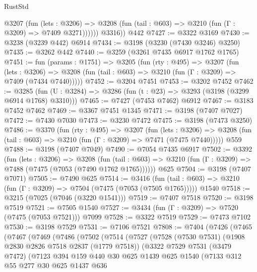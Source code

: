 \begin{lexlean}{RustStd}
\begin{coremodule}
            @3207
              (fun (lets : @3206) =>
              @3208 (fun (tail : @603) => @3210 (fun (Γ : @3209) => @7409 @3271))))))
        @3316))
    @442
@7427 := @3322 @3169
@7430 := @3238 (@3239 @442) @6914
@7434 := @3198 (@3230 (@7430 @3246) @3250)
@7435 := @3262 @442
@7440 := @3259 (@3261 @7435 @6917 @1762 @1765)
@7451 := fun (params : @1751) =>
  @3205
    (fun (rty : @495) =>
    @3207
      (fun (lets : @3206) =>
      @3208 (fun (tail : @603) => @3210 (fun (Γ : @3209) => @7409 (@7434 @7440)))))
@7452 := @3204 @7451
@7453 := @3202 @7452
@7462 := @3285 (fun (U : @3284) => @3286 (fun (t : @23) => @3293 (@3198 (@3299 @6914 @1768) @3310)))
@7465 := @7427 (@7453 @7462) @6912
@7467 := @3183 @7452 @7462
@7469 := @3367 @7451 @1345
@7471 := @3198 (@7407 @7027)
@7472 := @7430 @7030
@7473 := @3230 @7472
@7475 := @3198 (@7473 @3250)
@7486 := @3370
    (fun (rty : @495) =>
    @3207
      (fun (lets : @3206) =>
      @3208 (fun (tail : @603) => @3210 (fun (Γ : @3209) => @7471 (@7475 @7440)))))
    @559
@7488 := @3198 (@7407 @7049)
@7490 := @7054 @7435 @6917
@7502 := @3392
    (fun (lets : @3206) =>
    @3208
      (fun (tail : @603) => @3210 (fun (Γ : @3209) => @7488 (@7475 (@7053 (@7490 @1762 @1765))))))
    @625
@7504 := @3198 (@7407 @7071)
@7505 := @7490 @625
@7514 := @3416
    (fun (tail : @603) => @3210 (fun (Γ : @3209) => @7504 (@7475 (@7053 (@7505 @1765)))))
    @1540
@7518 := @3215 (@7025 (@7046 (@3220 @1541)))
@7519 := @7407 @7518
@7520 := @3198 @7519
@7521 := @7505 @1540
@7527 := @3434 (fun (Γ : @3209) => @7520 (@7475 (@7053 @7521))) @7099
@7528 := @3322 @7519
@7529 := @7473 @7102
@7530 := @3198 @7529
@7531 := @7106 @7521
@7808 := @7404
    (@7426
      (@7465
        (@7467
          (@7469
            (@7486
              (@7502
                (@7514
                  (@7527
                    (@7528
                      (@7530 @7531)
                      (@1908 @2830 @2826 @7518 @2837 (@1779 @7518))
                      (@3322
                        @7529
                        @7531
                        (@3479 @7472)
                        (@7123
                          @394
                          @159
                          @440
                          @30
                          @625
                          @1439
                          @625
                          @1540
                          (@7133
                            @312
                            @55
                            @277
                            @30
                            @625
                            @1437
                            @636

\end{coremodule}
\end{lexlean}
